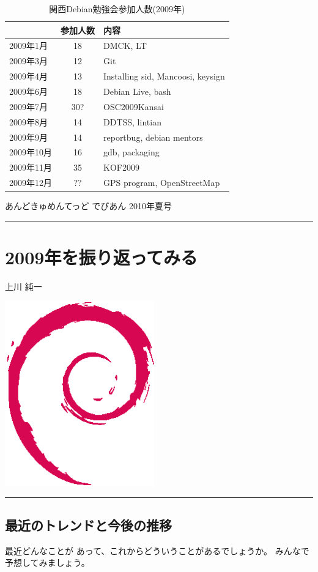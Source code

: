 \documentclass[mingoth,a4paper]{jsarticle}
\renewcommand{\dancersection}[2]{%
\newpage
あんどきゅめんてっど でびあん 2010年夏号
%
\vspace{0.1mm}\\
{\color{dancerlightblue}\rule{\hsize}{2mm}}

%
%
\begin{minipage}[t]{0.6\hsize}
\color{dancerdarkblue}
\vspace{1cm}
\section{#1}
\hfill{}#2\\
\end{minipage}
\begin{minipage}[t]{0.4\hsize}
\vspace{-2cm}
\hfill{}\includegraphics[height=8cm]{image200502/openlogo-nd.eps}\\
\vspace{-5cm}
\end{minipage}
%
%
{\color{dancerdarkblue}\rule{0.74\hsize}{2mm}}
%
\vspace{2cm}
}
\begin{document}
\begin{table}
\begin{minipage}{0.5\hsize}
\end{minipage}
\begin{minipage}{0.5\hsize}
 \caption{関西Debian勉強会参加人数(2009年)}\label{tab:count2009kansai}
 \begin{center}
  \begin{tabular}{|l|c|p{10em}|}
 \hline
 & 参加人数 & 内容 \\
 \hline
2009年1月 & 18 & DMCK, LT \\
2009年3月 & 12 & Git \\
2009年4月 & 13 & Installing sid, Mancoosi, keysign \\
2009年6月 & 18 & Debian Live, bash\\
2009年7月 & 30? & OSC2009Kansai \\
2009年8月 & 14 & DDTSS, lintian \\
2009年9月 & 14 & reportbug, debian mentors\\
2009年10月 & 16 & gdb, packaging \\
2009年11月 & 35 & KOF2009 \\
2009年12月 & ?? & GPS program, OpenStreetMap \\
 \hline
  \end{tabular}
 \end{center}
\end{minipage}
\end{table}

\clearpage

\dancersection{2009年を振り返ってみる}{上川 純一}

\subsection{最近のトレンドと今後の推移}

最近どんなことが
あって、これからどういうことがあるでしょうか。
みんなで予想してみましょう。
\end{document}
